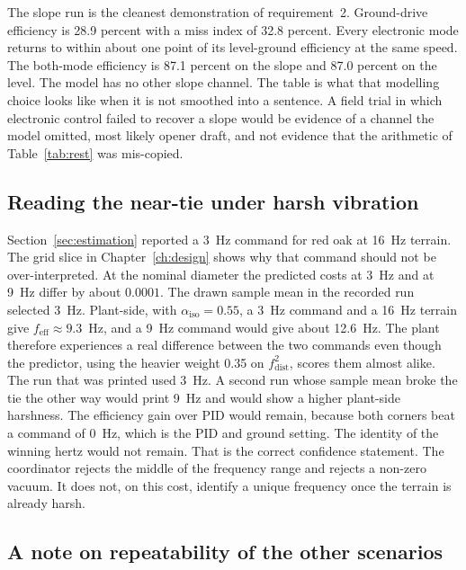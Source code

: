 The slope run is the cleanest demonstration of requirement~2. Ground-drive efficiency is 28.9 percent with a miss index of 32.8 percent. Every electronic mode returns to within about one point of its level-ground efficiency at the same speed. The both-mode efficiency is 87.1 percent on the slope and 87.0 percent on the level. The model has no other slope channel. The table is what that modelling choice looks like when it is not smoothed into a sentence. A field trial in which electronic control failed to recover a slope would be evidence of a channel the model omitted, most likely opener draft, and not evidence that the arithmetic of Table~\ref{tab:rest} was mis-copied.

\subsection{Reading the near-tie under harsh vibration}

Section~\ref{sec:estimation} reported a 3~Hz command for red oak at 16~Hz terrain. The grid slice in Chapter~\ref{ch:design} shows why that command should not be over-interpreted. At the nominal diameter the predicted costs at 3~Hz and at 9~Hz differ by about $0.0001$. The drawn sample mean in the recorded run selected 3~Hz. Plant-side, with $\alpha_{\mathrm{iso}}=0.55$, a 3~Hz command and a 16~Hz terrain give $f_{\mathrm{eff}}\approx 9.3$~Hz, and a 9~Hz command would give about 12.6~Hz. The plant therefore experiences a real difference between the two commands even though the predictor, using the heavier weight 0.35 on $f_{\mathrm{dist}}^2$, scores them almost alike. The run that was printed used 3~Hz. A second run whose sample mean broke the tie the other way would print 9~Hz and would show a higher plant-side harshness. The efficiency gain over PID would remain, because both corners beat a command of 0~Hz, which is the PID and ground setting. The identity of the winning hertz would not remain. That is the correct confidence statement. The coordinator rejects the middle of the frequency range and rejects a non-zero vacuum. It does not, on this cost, identify a unique frequency once the terrain is already harsh.

\subsection{A note on repeatability of the other scenarios}


